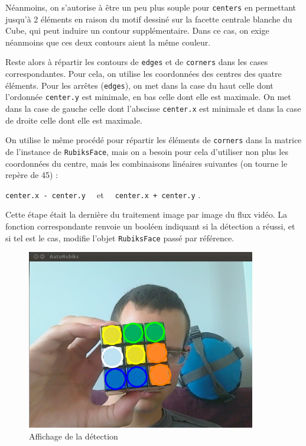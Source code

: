 \documentclass[a4paper,11pt]{article}
\begin{document}
Néanmoins, on s'autorise à être un peu plus souple pour \verb|centers| en permettant jusqu'à 2 éléments 
en raison du motif dessiné sur la facette
centrale blanche du Cube, qui peut induire un contour supplémentaire. Dans ce cas, on exige néanmoins que ces
deux contours aient la même couleur.

Reste alors à répartir les contours de \verb|edges| et de \verb|corners| dans les cases correspondantes. Pour cela,
on utilise les coordonnées des centres des quatre éléments. Pour les arrêtes (\verb|edges|), on met dans la case
du haut celle dont l'ordonnée \verb|center.y| est minimale, en bas celle dont elle est maximale. On met dans 
la case de gauche celle dont l'abscisse \verb|center.x| est minimale et dans la case de droite celle dont elle 
est maximale.

On utilise le même procédé pour répartir les éléments de \verb|corners| dans la matrice de l'instance de 
\verb|RubiksFace|, mais on a besoin pour cela d'utiliser non plus les coordonnées du centre, mais les combinaisons
linéaires suivantes (on tourne le repère de 45\textdegree) :
\begin{center}
 \verb|center.x - center.y  | et \verb|  center.x + center.y| .
\end{center}

Cette étape était la dernière du traitement image par image du flux vidéo. La fonction correspondante renvoie
un booléen indiquant si la détection a réussi, et si tel est le cas, modifie l'objet \verb|RubiksFace| passé par 
référence.

\begin{figure}[h]
\begin{center}
 \includegraphics[width=10cm]{webcam.png} 
\end{center}
 \caption{Affichage de la détection}
 \label{Affichage de la détection}
\end{figure}
\end{document}

